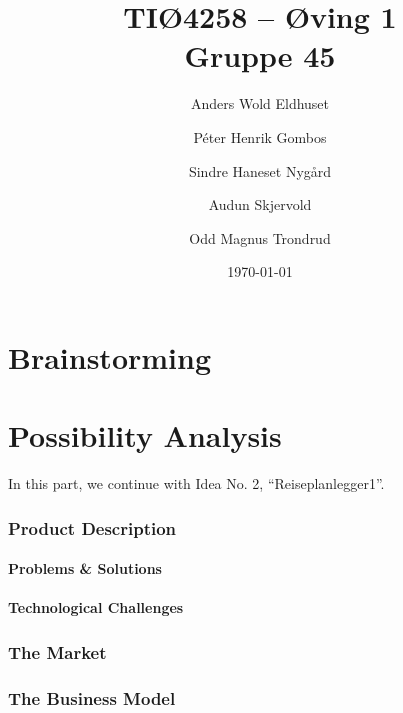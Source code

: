 \documentclass[a4paper]{article}
\title{TIØ4258 -- Øving 1 \\ Gruppe 45}
\author{
    Anders Wold Eldhuset \and
    Péter Henrik Gombos \and
    Sindre Haneset Nygård \and
    Audun Skjervold \and
    Odd Magnus Trondrud
}
\date{\today}
\begin{document}
    \maketitle
    \newpage
    \setcounter{secnumdepth}{2}

    \part{Brainstorming}
    	

    \part{Possibility Analysis}
    	In this part, we continue with Idea No. 2, ``Reiseplanlegger1''.
    	\section{Product Description}
    		\subsection{Problems \& Solutions}
	    		
    		\subsection{Technological Challenges}
	    			
	    \section{The Market} %
            

            

            

            

	    \section{The Business Model}
\end{document}
